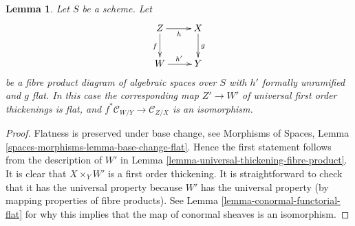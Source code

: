 \documentclass[10pt,a4paper]{amsart}
\theoremstyle{plain}
\newtheorem{lemma}[subsection]{Lemma}
\theoremstyle{definition}
\theoremstyle{remark}
\numberwithin{equation}{subsection}
\begin{document}
\begin{lemma}
\label{lemma-universal-thickening-fibre-product-flat}
Let $S$ be a scheme. Let
$$
\xymatrix{
Z \ar[r]_h \ar[d]_f & X \ar[d]^g \\
W \ar[r]^{h'} & Y
}
$$
be a fibre product diagram of algebraic spaces over $S$ with
$h'$ formally unramified and $g$ flat. In this case the corresponding
map $Z' \to W'$ of universal first order thickenings is flat, and
$f^*\mathcal{C}_{W/Y} \to \mathcal{C}_{Z/X}$ is an isomorphism.
\end{lemma}

\begin{proof}
Flatness is preserved under base change, see
Morphisms of Spaces, Lemma \ref{spaces-morphisms-lemma-base-change-flat}.
Hence the first statement follows from the description of $W'$ in
Lemma \ref{lemma-universal-thickening-fibre-product}.
It is clear that $X \times_Y W'$ is a first order thickening.
It is straightforward to check that it has the universal property
because $W'$ has the universal property (by mapping properties of
fibre products). See
Lemma \ref{lemma-conormal-functorial-flat}
for why this implies that the map of conormal sheaves is an isomorphism.
\end{proof}
\end{document}
